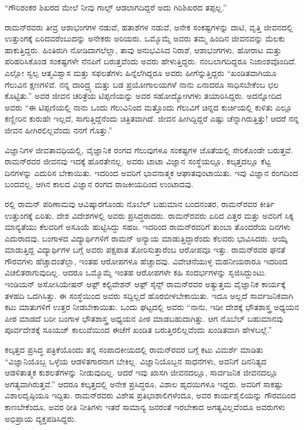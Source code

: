 “ಗೌರಿಶಂಕರ ಶಿಖರದ ಮೇಲೆ ನೀವು ಗಾಲ್ಫ್ ಆಡಲಾಗದಿದ್ದರೆ ಅದು ಗಿರಿಶಿಖರದ ತಪ್ಪಲ್ಲ.”

ರಾಮನ್‍ರವರು ತೀವ್ರ ಆಶಾಭಂಗಗಳ ನಡುವೆ, ಹತಾಶೆಗಳ ನಡುವೆ, ಅನೇಕ ಸಂಕಷ್ಟಗಳನ್ನು ದಾಟಿ, ವೃತ್ತಿ ಜೀವನದಲ್ಲಿ ಉತ್ತುಂಗಕ್ಕೆ ಏರಿದವರೆಂಬುದನ್ನು ಅನೇಕರು ಅರಿಯರು. ಒಮ್ಮೊಮ್ಮೆ ಅವರು ತಮ್ಮ ಹಿಂದಿನ ಜೀವನವನ್ನು ಮೆಲಕು ಹಾಕುತ್ತಿದ್ದರು. ಹಿಂತಿರುಗಿ ನೋಡಿದಾಗಲೆಲ್ಲಾ, ತಾವು ಅನುಭವಿಸಿದ ನಿರಾಶೆ, ಆಶಾಭಂಗಗಳು, ಹೋರಾಟ ಮತ್ತು ಪರಿಹರಿಸಿಕೊಂಡ ಸಂಕಷ್ಟಗಳೇ ನೆನಪಿಗೆ ಬರುತ್ತವೆಂದು ಅವರು ಹೇಳುತ್ತಿದ್ದರು. ನಂಬಲಾಗದಿದ್ದರೂ ನಿಜಾಂಶವೊಂದಿದೆ. ಎಲ್ಲೋ ಸ್ವಲ್ಪ ಆತ್ಮವಿಶ್ವಾಸ ಮತ್ತು ಸಫಲತೆಗಳು ಹಿನ್ನೆಲೆಗಿದ್ದರೂ ಅವರು ಹೀಗೆನ್ನುತ್ತಿದ್ದರು\enginline{--} “ಖಂಡಿತವಾಗಿಯೂ ಗೆಲುವಿನ ಕ್ಷಣಗಳಿವೆ. ನನ್ನ ದಾರಿದ್ರ್ಯ ಮತ್ತು ಬಡ ಪ್ರಯೋಗಾಲಯಗಳೆ ನಾನು ಏನಾದರೂ ಸಾಧಿಸಬೇಕೆಂಬ ಛಲ ಕೊಟ್ಟಿತು.” ಅವರ ಜೀವನ ಚರಿತ್ರೆಯ ಟಿಪ್ಪಣಿಯನ್ನು ಅವರ ಸಹೋದ್ಯೋಗಿ\-ಗಳು ತಯಾರಿಸಿದ್ದರು. ಅದನ್ನೋದಿದ ಅವರು “ಈ ಟಿಪ್ಪಣಿಯಲ್ಲಿ ನಾನು ಒಂದು ಗೆಲುವಿನಿಂದ ಮತ್ತೊಂದು ಗೆಲುವಿಗೆ ಚಿನ್ನದ ಕುರ್ಚಿಯಲ್ಲಿ ಕುಳಿತು ಎಲ್ಲೂ ಕಣ್ಣೀರಿನ ಕುರುಹೇ ಇಲ್ಲದೆ, ಸಾಗುತ್ತಿದ್ದೆ\-ನೆಂದು ಚಿತ್ರಿತವಾಗಿದೆ. ಜೀವನ ಹೀಗಿದ್ದಿದ್ದರೆ ಎಷ್ಟು ಚೆನ್ನಾಗಿರುತ್ತಿತ್ತು! ಆದರೆ ನನ್ನ ಜೀವನ ಹೀಗಿರಲಿಲ್ಲವೆಂದು ನನಗೆ ಗೊತ್ತು.”

ವಿಜ್ಞಾನಿಗಳ ಜೀವತಾವಧಿಯಲ್ಲಿ, ವೈಜ್ಞಾನಿಕ ರಂಗದ ಗೆಲುವುಗಳೂ ಸಂಕಷ್ಟಗಳ ಜೊತೆಯಲ್ಲಿ ಸೇರಿಕೊಂಡೇ ಬರುತ್ತವೆ. ರಾಮನ್‍ರವರ ಜೀವನವು ಇದಕ್ಕೆ ಹೊರತೇನಲ್ಲ. ಅವರು ಟಾಟಾ ವಿಜ್ಞಾನ ಸಂಸ್ಥೆಯಲ್ಲೂ, ಕಲ್ಕತ್ತದಲ್ಲೂ ಕೆಟ್ಟ ದಿನಗಳನ್ನು ಎದುರಿಸ ಬೇಕಾಯಿತು. ಇದರಿಂದ ಅವರಿಗೆ ಭಾವನಾತ್ಮಕ ಆಘಾತವುಂಟಾಯಿತು. ಇವು ವಿಜ್ಞಾನ ರಂಗದಿಂದ ಬಂದವಲ್ಲ, ಆಗಿನ ಕಾಲದ ವಿಜ್ಞಾನ ರಂಗದ ರಾಜಕೀಯದಿಂದ ಉಂಟಾದವು.

ರಲ್ಲಿ ರಾಮನ್ ಪರಿಣಾಮವು ಆವಿಷ್ಕಾರಗೊಂಡು ನೊಬೆಲ್ ಬಹುಮಾನ ಬಂದನಂತರ, ರಾಮನ್‍ರವರ ಕೀರ್ತಿ ಉತ್ತುಂಗಕ್ಕೆ ಏರಿತು. ದೇಶ ವಿದೇಶಗಳಲ್ಲಿ ಅವರು ಪ್ರಸಿದ್ಧರಾದರು. ರಾಮನ್‍ರವರು ಏರಿದ ಎತ್ತರ ಮತ್ತು ಅವರಿಗೆ ಸಿಕ್ಕ ಮಾನ್ಯತೆಯು ಕೆಲವರಿಗೆ ಅಸೂಯೆ ಹುಟ್ಟಿಸಿದ್ದು ಸಹಜ. ಇದರಿಂದ ರಾಮನ್‍ರವರಿಗೆ ತುಂಬಾ ತೊಂದರೆಯ ದಿನಗಳು ಎದುರಾದವು. ಬಂಗಾಳದ ವಿದ್ಯಾರ್ಥಿಗಳಿಗೆ ರಾಮನ್ ಅನ್ಯಾಯ ಮಾಡುತ್ತಿದ್ದಾರೆಂದು ಕೆಲವರು ಭಾವಿಸಿದರು. ಆಯ್ಕೆ ಮಾಡುತ್ತಿದ್ದ ವಿದ್ಯಾರ್ಥಿಗಳ ಬಗ್ಗೆ ಅವರು ಪಕ್ಷಪಾತ ತೋರಿಸುತ್ತಾರೆಂಬ ಆರೋಪವೂ ಇತ್ತು. ರಾಮನ್‍ರವರ ಘನತೆ ಗೌರವಗಳು ಹೆಚ್ಚಾದಂತೆಲ್ಲಾ, ಇಂತಹ ಆರೋಪಗಳೂ ಹೆಚ್ಚಾದವು. ವಿವೇಚನೆ\-ಯುಳ್ಳ ಮಹನೀಯರಾರೂ ಇದರಿಂದ ವಿಚಲಿತರಾಗುವುದಿಲ್ಲ. ಆದರೂ ಒಮ್ಮೊಮ್ಮೆ ಇಂತಹ ಆರೋಪಗಳೇ ಕಹಿ ಸಂದರ್ಭಗಳನ್ನು ಸೃಜಿಸಿದ್ದುಂಟು. ಇಂಡಿಯನ್ ಅಸೋಸಿಯೇಷನ್ ಆಫ಼್ ಕಲ್ಟಿವೇಶನ್ ಆಫ಼್ ಸೈನ್ಸ್ ರಾಮನ್‍ರವರ ಅತ್ಯುತ್ತಮ ವೈಜ್ಞಾನಿಕ ಕಾರ್ಯಕ್ಕೆ ತಳಹದಿ ಒದಗಿಸಿತ್ತು. ಈ ಸಂಸ್ಥೆಯಿಂದ ಅವರು ಸದ್ದಿಲ್ಲದೆ ಹೊರಬೀಳಬೇಕಾಯಿತು. ಇದೂ ಅಲ್ಲದೆ ಸಾರ್ವಜನಿಕವಾಗಿ ಕಟು ಮಾತುಗಳಿಗೆ ಉತ್ತರ ನೀಡಬೇಕಾಯಿತು. ಒಂದು ಘಟ್ಟದಲ್ಲಿ ಅವರು “ನಾನು, ಇಡೀ ದೇಶಕ್ಕೆ ಭೌತಶಾಸ್ತ್ರ ಅಧ್ಯಯನ ಪೀಠ ಮಾಡದೆ ಬರೀ ಬಂಗಾಳ ಭೌತಶಾಸ್ತ್ರ ಅಧ್ಯಯನ ಪೀಠ ಮಾಡಬಹುದಾಗಿತ್ತು. ಆಗ ನೊಬೆಲ್ ಬಹುಮಾನವು ಪೂರ್ವದೇಶಕ್ಕೆ ಸೂಯಜ್ ಕಾಲುವೆಯಿಂದ ಈಚೆಗೆ ಖಂಡಿತ ಬರುತ್ತಿರಲಿಲ್ಲವೆಂದು ಖಂಡಿತವಾಗಿ ಹೇಳಬಲ್ಲೆ.”

ಕಲ್ಕತ್ತದ ಪ್ರಸಿದ್ಧ ಪತ್ರಿಕೆಯೊಂದು ತನ್ನ ಸಂಪಾದಕೀಯದಲ್ಲಿ ರಾಮನ್‍ರವರ ಬಗ್ಗೆ ಕಟು ವಿಮರ್ಶೆ ಮಾಡಿತು\enginline{--} “ವಿಜ್ಞಾನಿಯೊಬ್ಬ ಒಳ್ಳೆಯ ಆಡಳಿತಗಾರನಾಗ ಬೇಕಿಲ್ಲ. ವಿಜ್ಞಾನಿಯೊಬ್ಬನ ಸಾಧನೆಗಳು, ಅವನಿಗೆ ದಿನನಿತ್ಯದ ಆಡಳಿತಾತ್ಮಕ ಕುಶಲತೆಗಳನ್ನು ನೀಡುವುದಿಲ್ಲ. ಆದರೆ ಇವು ಖಾಸಗಿ ಜೀವನದಲ್ಲೂ, ಸಾರ್ವಜನಿಕ ಜೀವನದಲ್ಲೂ ಅಗತ್ಯವಾಗಿರುತ್ತವೆ.” ಆದರೂ ಕಲ್ಕತ್ತದಲ್ಲಿ ಅನೇಕ ಪ್ರಸಿದ್ಧರೂ, ವಿಶಾಲ ಹೃದಯಿಗಳೂ ಇದ್ದರು. ಅವರಿಗೆ ಸಾಕಷ್ಟು ವಿಶಾಲದೃಷ್ಠಿಯೂ ಇದ್ದಿತು. ರಾಮನ್‍ರವರು ವಿಶೇಷ ಪ್ರತಿಭಾಶಾಲಿಗಳೆಂದೂ, ಅವರ ಕಾರ್ಯಶೈಲಿಯನ್ನು ಗೌರವದಿಂದ ಕಾಣಬೇಕೆಂದೂ, ಅವರ ರೀತಿ ನೀತಿಗಳು ಇತರೆ ಸಾಮಾನ್ಯ ಜನರಂತೆ ಇರಬೇಕಾದ ಅಗತ್ಯವಿಲ್ಲವೆಂದೂ ಅವರುಗಳು ಅಭಿಪ್ರಾಯ ವ್ಯಕ್ತಪಡಿಸಿದ್ದರು.

